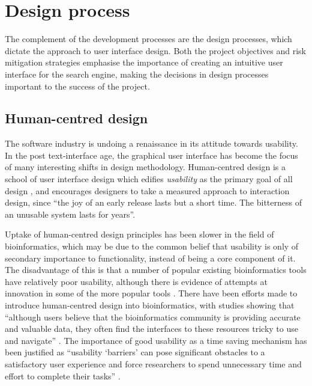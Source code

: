 \newpage
\section{Design process}\label{sec:design-process}

The complement of the development processes are the design processes,
which dictate the approach to user interface design. Both the project
objectives and risk mitigation strategies emphasise the importance of
creating an intuitive user interface for the search engine, making the
decisions in design processes important to the success of the project.

\subsection{Human-centred design}\label{subsec:user-centred-design}

The software industry is undoing a renaissance in its attitude towards
usability. In the post text-interface age, the graphical user
interface has become the focus of many interesting shifts in design
methodology. Human-centred design is a school of user interface design
which edifies \textit{usability} as the primary goal of all design
\cite{maguire2001methods}, and encourages designers to take a measured
approach to interaction design, since ``the joy of an early release
lasts but a short time. The bitterness of an unusable system lasts for
years''.

Uptake of human-centred design principles has been slower in the field
of bioinformatics, which may be due to the common belief that
usability is only of secondary importance to functionality, instead of
being a core component of it. The disadvantage of this is that a
number of popular existing bioinformatics tools have relatively poor
usability, although there is evidence of attempts at innovation in
some of the more popular tools \cite{lu2011pubmed,
  hearst2007biotext}. There have been efforts made to introduce
human-centred design into bioinformatics, with studies showing that
``although users believe that the bioinformatics community is
providing accurate and valuable data, they often find the interfaces
to these resources tricky to use and navigate''
\cite{pavelin2012bioinformatics}. The importance of good usability as
a time saving mechanism has been justified as ``usability `barriers'
can pose significant obstacles to a satisfactory user experience and
force researchers to spend unnecessary time and effort to complete
their tasks'' \cite{bolchini2009better}.


